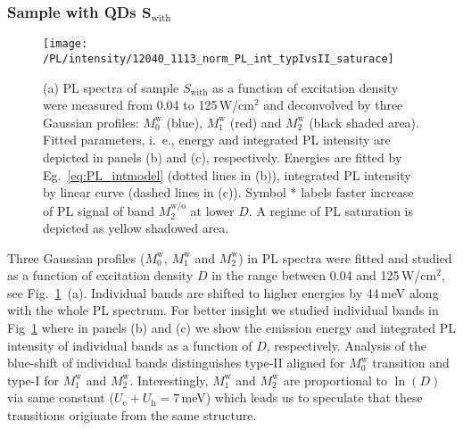 \subsubsection*{Sample with QDs $\mathbf{S_\mathrm{with}}$}
\begin{figure}
	\centering
	\texttt{[image: /PL/intensity/12040\_1113\_norm\_PL\_int\_typIvsII\_saturace]}
	\caption{(a) PL spectra of sample $S_\mathrm{with}$ as a function of excitation density were measured from 0.04 to 125$\,$W/cm$^2$ and deconvolved by three Gaussian profiles: $M_0^\mathrm{w}$ (blue), $M_1^\mathrm{w}$ (red) and $M_2^\mathrm{w}$ (black shaded area). Fitted parameters, i.~e., energy and integrated PL intensity are depicted in panels (b) and (c), respectively. Energies are fitted by Eg.~\ref{eq:PL_intmodel} (dotted lines in (b)), integrated PL intensity by linear curve (dashed lines in (c)). Symbol * labels faster increase of PL signal of band $M_2^\mathrm{w/o}$ at lower $D$. A regime of PL saturation is depicted as yellow shadowed area.}
	\label{fig:QD_w_int}
\end{figure}

Three Gaussian profiles ($M_0^\mathrm{w}$, $M_1^\mathrm{w}$ and $M_2^\mathrm{w}$) in PL spectra were fitted and studied as a function of excitation density $D$ in the range between 0.04 and 125$\,$W/cm$^2$, see Fig.~\ref{fig:QD_w_int}~(a).
%
Individual bands are shifted to higher energies by 44$\,$meV along with the whole PL spectrum. For better insight we studied individual bands in Fig~\ref{fig:QD_w_int} where in panels (b) and (c) we show the emission energy and integrated PL intensity of individual bands as a function of $D$, respectively.
%
%
 Analysis of the blue-shift of individual bands distinguishes type-II aligned for $M_0^\mathrm{w}$ transition and type-I for $M_1^\mathrm{w}$ and $M_2^\mathrm{w}$. Interestingly, $M_1^\mathrm{w}$ and $M_2^\mathrm{w}$ are proportional to $\ln(D)$ via same constant ($U_\mathrm{e}+U_\mathrm{h}=7$$\,$meV) which leads us to speculate that these transitions originate from the same structure. 

